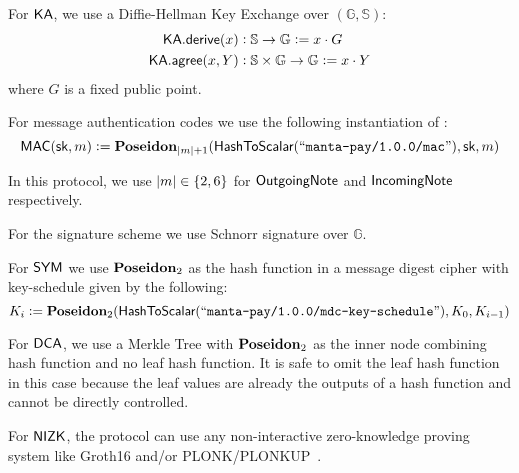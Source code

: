 \begin{definition}
    For ${\textsf{KA}}$, we use a Diffie-Hellman Key Exchange over $(\mathbb{G}, \mathbb{S})$:
    \begin{align*}
        {\textsf{KA}}.{\textsf{derive}}(x)   &: \mathbb{S} \to \mathbb{G}                   := x \cdot G \\
        {\textsf{KA}}.{\textsf{agree}}(x, Y) &: \mathbb{S} \times \mathbb{G} \to \mathbb{G} := x \cdot Y
    \end{align*}
    where $G$ is a fixed public point.
\end{definition}

\begin{definition}
    For message authentication codes we use the following instantiation of \Poseidon{}:
    \[{\textsf{MAC}}({\textsf{sk}}, m) := {\textbf{Poseidon}}_{\left|m\right| + 1}({\textsf{HashToScalar}}({``\texttt{manta-pay/1.0.0/mac}"}), {\textsf{sk}}, m)\]

    In this protocol, we use $|m| \in \set{2, 6}$ for ${\textsf{OutgoingNote}}$ and ${\textsf{IncomingNote}}$ respectively.
\end{definition}

\begin{definition}
    For the signature scheme we use Schnorr signature over $\mathbb{G}$.
\end{definition}

\begin{definition}
    For ${\textsf{SYM}}$ we use ${\textbf{Poseidon}}_2$ as the hash function in a message digest cipher with key-schedule given by the following:
    \[K_i := {\textbf{Poseidon}}_2({\textsf{HashToScalar}}({``\texttt{manta-pay/1.0.0/mdc-key-schedule}"}), K_0, K_{i-1})\]
\end{definition}

\begin{definition}
    For ${\textsf{DCA}}$, we use a Merkle Tree with ${\textbf{Poseidon}}_2$ as the inner node combining hash function and no leaf hash function. It is safe to omit the leaf hash function in this case because the leaf values are already the outputs of a hash function and cannot be directly controlled.
\end{definition}

\begin{definition} \label{def:concrete-zkp}
    For ${\textsf{NIZK}}$, the protocol can use any non-interactive zero-knowledge proving system like Groth16 \cite{KRRS21USENIX} and/or PLONK/PLONKUP~\cite{plonk,plonkup}. 
\end{definition}

